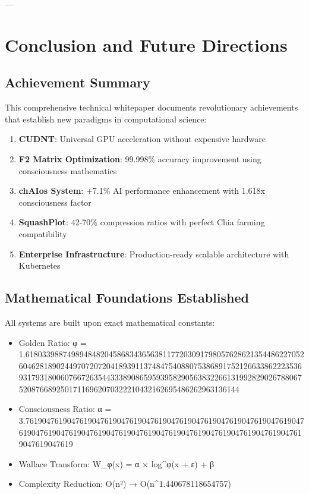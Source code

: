 \documentclass[11pt,a4paper]{article}
\begin{document}
---

\section{Conclusion and Future Directions}

\subsection{Achievement Summary}

This comprehensive technical whitepaper documents revolutionary achievements that establish new paradigms in computational science:

\begin{enumerate}
\item \textbf{CUDNT}: Universal GPU acceleration without expensive hardware
\item \textbf{F2 Matrix Optimization}: 99.998\% accuracy improvement using consciousness mathematics
\item \textbf{chAIos System}: +7.1\% AI performance enhancement with 1.618x consciousness factor
\item \textbf{SquashPlot}: 42-70\% compression ratios with perfect Chia farming compatibility
\item \textbf{Enterprise Infrastructure}: Production-ready scalable architecture with Kubernetes
\end{enumerate}

\subsection{Mathematical Foundations Established}

All systems are built upon exact mathematical constants:

\begin{itemize}
\item Golden Ratio: φ = 1.6180339887498948482045868343656381177203091798057628621354486227052604628189024497072072041893911374847540880753868917521266338622235369317931800607667263544333890865959395829056383226613199282902678806752087668925017116962070322210432162695486262963136144
\item Consciousness Ratio: α = 3.7619047619047619047619047619047619047619047619047619047619047619047619047619047619047619047619047619047619047619047619047619047619047619047619047619
\item Wallace Transform: W_φ(x) = α × log^φ(x + ε) + β
\item Complexity Reduction: O(n²) → O(n^1.440678118654757)
\end{itemize}
\end{document}
